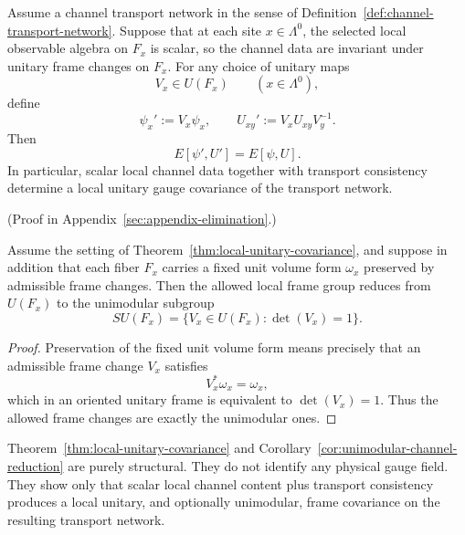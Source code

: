\begin{theorem}
\label{thm:local-unitary-covariance}
Assume a channel transport network in the sense of
Definition~\ref{def:channel-transport-network}. Suppose that at each site
$x\in\Lambda^0$, the selected local observable algebra on $F_x$ is scalar, so
the channel data are invariant under unitary frame changes on $F_x$. For any
choice of unitary maps
\[
V_x\in U(F_x)
\qquad(x\in\Lambda^0),
\]
define
\[
\psi_x' := V_x\psi_x,
\qquad
U_{xy}' := V_xU_{xy}V_y^{-1}.
\]
Then
\[
E[\psi',U']=E[\psi,U].
\]
In particular, scalar local channel data together with transport consistency
determine a local unitary gauge covariance of the transport network.
\end{theorem}

(Proof in Appendix~\ref{sec:appendix-elimination}.)

\begin{corollary}
\label{cor:unimodular-channel-reduction}
Assume the setting of Theorem~\ref{thm:local-unitary-covariance}, and suppose
in addition that each fiber $F_x$ carries a fixed unit volume form $\omega_x$
preserved by admissible frame changes. Then the allowed local frame group
reduces from $U(F_x)$ to the unimodular subgroup
\[
SU(F_x)=\{V_x\in U(F_x):\det(V_x)=1\}.
\]
\end{corollary}

\begin{proof}
Preservation of the fixed unit volume form means precisely that an admissible
frame change $V_x$ satisfies
\[
V_x^*\omega_x=\omega_x,
\]
which in an oriented unitary frame is equivalent to $\det(V_x)=1$. Thus the
allowed frame changes are exactly the unimodular ones.
\end{proof}

\begin{remark}
\label{rem:mathematical-gauge-mechanism}
Theorem~\ref{thm:local-unitary-covariance} and
Corollary~\ref{cor:unimodular-channel-reduction} are purely structural. They do
not identify any physical gauge field. They show only that scalar local
channel content plus transport consistency produces a local unitary, and
optionally unimodular, frame covariance on the resulting transport network.
\end{remark}

